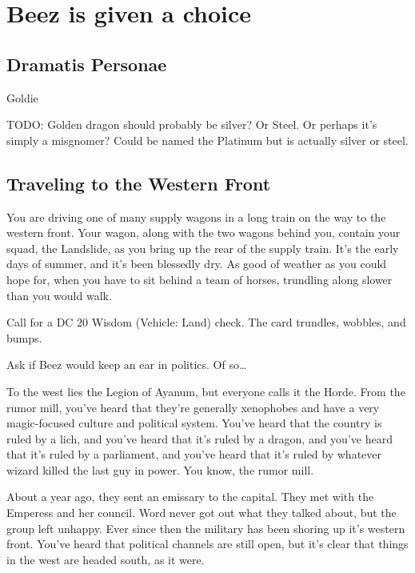 \section{Beez is given a choice}
\subsection{Dramatis Personae}

Goldie

TODO: Golden dragon should probably be silver?
Or Steel.
Or perhaps it's simply a misgnomer?
Could be named the Platinum but is actually silver or steel.

\begin{multicols}{2}
\subsection{Traveling to the Western Front}
  \begin{aloud}
  You are driving one of many supply wagons in a long train on the way to the western front.
  Your wagon, along with the two wagons behind you, contain your squad, the Landslide, as you
    bring up the rear of the supply train.
  It's the early days of summer, and it's been blessedly dry.
  As good of weather as you could hope for, when you have to sit behind a team of horses,
    trundling along slower than you would walk.
  \end{aloud}

Call for a DC 20 Wisdom (Vehicle: Land) check.
The card trundles, wobbles, and bumps.

Ask if Beez would keep an ear in politics.
Of so\dots

  \begin{aloud}
  To the west lies the Legion of Ayanum, but everyone calls it the Horde.
  From the rumor mill, you've heard that they're generally xenophobes and have a very magic-focused
    culture and political system.
  You've heard that the country is ruled by a lich, and you've heard that it's ruled by a dragon,
    and you've heard that it's ruled by a parliament, and you've heard that it's ruled by whatever
    wizard killed the last guy in power.
  You know, the rumor mill.

  About a year ago, they sent an emissary to the capital.
  They met with the Emperess and her council.
  Word never got out what they talked about, but the group left unhappy.
  Ever since then the military has been shoring up it's western front.
  You've heard that political channels are still open, but it's clear that things in the west are
    headed south, as it were.
  \end{aloud}


\end{multicols}
